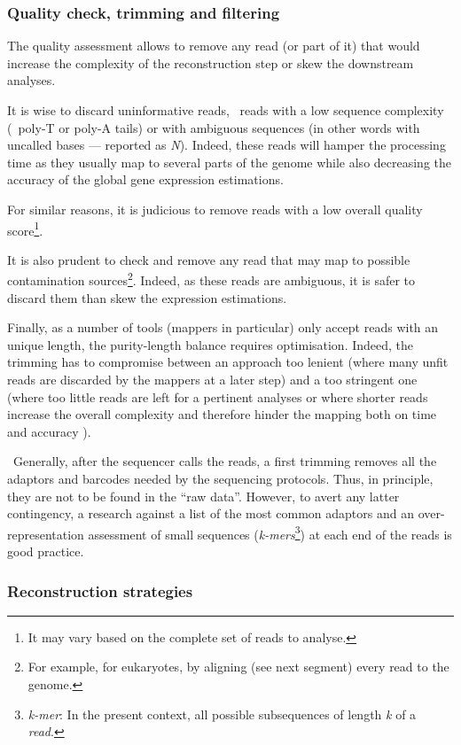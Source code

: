 \subsubsection{Quality check, trimming and filtering}\label{subsub:trim}

The quality assessment allows to remove any read (or part of it) that would
increase the complexity of the reconstruction step or skew the downstream analyses.

It is wise to discard uninformative reads, \ie\ reads with a low sequence
complexity (\eg\ poly-T or poly-A tails) or with ambiguous sequences (in other
words with uncalled bases --- reported as \emph{N}).
Indeed, these reads will hamper the processing time as they
usually map to several parts of the genome while also decreasing the accuracy of
the global gene expression estimations.

For similar reasons, it is judicious to remove reads with a low overall quality
score\footnote{It may vary based on the complete set of reads to analyse.}.

It is also prudent to check and remove any read that may map to possible
contamination sources\footnote{For example, for eukaryotes, by aligning (see next
segment) every read to the  genome.}.
Indeed, as these reads are ambiguous, it is safer
to discard them than skew the expression estimations.

Finally, as a number of tools (mappers in particular) only accept reads
with an unique length, the purity-length balance requires optimisation.
Indeed, the trimming has to compromise between
an approach too lenient (where many unfit reads are discarded
by the mappers at a later step) and
a too stringent one (where too little reads are left for a pertinent analyses or
where shorter reads increase the overall complexity and therefore hinder
the mapping both on time and accuracy ).

\NB\ Generally, after the sequencer calls the reads, a first trimming removes
all the adaptors and barcodes needed by the sequencing protocols. Thus,
in principle, they are not to be found in the \enquote{raw data}.
However, to avert any latter contingency, a research against
a list of the most common adaptors and an over-representation assessment of small
sequences (\emph{k-mers}\footnote{\emph{k-mer}: In the present context, all
possible subsequences of length
\emph{k} of a \emph{read}.}) at each end of the reads is good practice.


\subsubsection{Reconstruction strategies}


